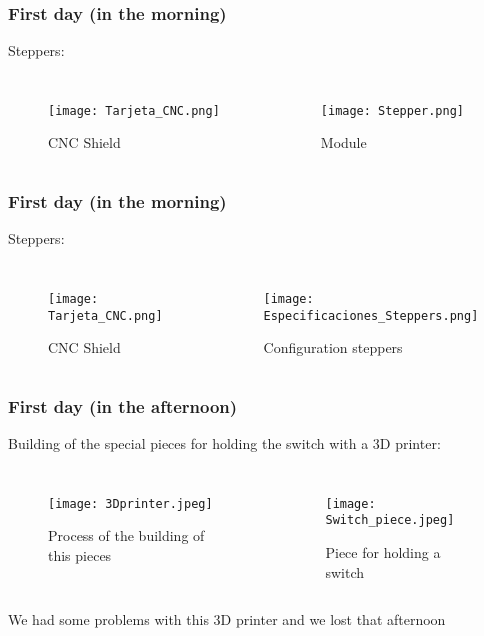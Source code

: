 \documentclass{beamer}
\begin{document}
\begin{frame}
\frametitle{First day (in the morning)}
Steppers:
\begin{columns}

\begin{figure}[hbtp]
\centering
\texttt{[image: Tarjeta\_CNC.png]}
\caption{CNC Shield}
\end{figure}


\begin{figure}[hbtp]
\centering
\texttt{[image: Stepper.png]}
\caption{Module}
\end{figure}

\end{columns}
\end{frame}

\begin{frame}
\frametitle{First day (in the morning)}
Steppers:
\begin{columns}

\begin{figure}[hbtp]
\centering
\texttt{[image: Tarjeta\_CNC.png]}
\caption{CNC Shield}
\end{figure}


\begin{figure}[hbtp]
\centering
\texttt{[image: Especificaciones\_Steppers.png]}
\caption{Configuration steppers}
\end{figure}

\end{columns}
\end{frame}

\begin{frame}
\frametitle{First day (in the afternoon)}
Building of the special pieces for holding the switch with a 3D printer:

\begin{columns}

\begin{figure}[hbtp]
\centering
\texttt{[image: 3Dprinter.jpeg]}
\caption{Process of the building of this pieces}
\end{figure}


\begin{figure}[hbtp]
\centering
\texttt{[image: Switch\_piece.jpeg]}
\caption{Piece for holding a switch}
\end{figure}

\end{columns}

We had some problems with this 3D printer and we lost that afternoon
\end{frame}
\end{document}

